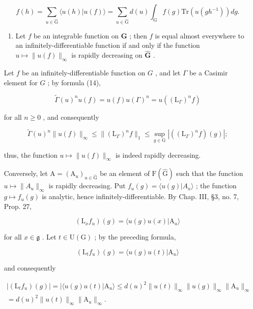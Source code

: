 \[
f (h) = \sum_ {u \in \hat {\mathrm{G}}} \langle u (h) | u (f) \rangle = \sum_ {u \in \hat {\mathrm{G}}} d (u) \int_ {\mathrm{G}} f (g) \mathrm{Tr} (u (g h ^ {- 1}))   d g.
\]

\begin{enumerate}
\def\labelenumi{\alph{enumi})}
\setcounter{enumi}{1}
\tightlist
\item
  Let \(f\) be an integrable function on \(\mathbf{G}\) ; then \(f\) is equal almost everywhere to an infinitely-differentiable function if and only if the function \(u \mapsto \| u(f) \|_{\infty}\) is rapidly decreasing on \(\hat{\mathbf{G}}\) .
\end{enumerate}

Let \(f\) be an infinitely-differentiable function on \(G\) , and let \(\Gamma\) be a Casimir element for \(G\) ; by formula (14),

\[
\tilde {\Gamma} (u) ^ {n} u (f) = u (f) u (\Gamma) ^ {n} = u ((\mathrm{L} _ {\Gamma}) ^ {n} f)
\]

for all \(n \geq 0\) , and consequently

\[
\tilde {\Gamma} (u) ^ {n} \| u (f) \| _ {\infty} \leq \| (\mathrm{L} _ {\Gamma}) ^ {n} f \| _ {1} \leq \sup _ {g \in \mathrm{G}} | ((\mathrm{L} _ {\Gamma}) ^ {n} f) (g) |;\tag{15}
\]

thus, the function \(u \mapsto \|u(f)\|_{\infty}\) is indeed rapidly decreasing.

Conversely, let \(\mathrm{A} = (\mathrm{A}_{u})_{u \in \hat{\mathrm{G}}}\) be an element of \(\mathrm{F}(\hat{\mathrm{G}})\) such that the function \(u \mapsto \|A_{u}\|_{\infty}\) is rapidly decreasing. Put \(f_{u}(g) = \langle u(g)|A_{u} \rangle\) ; the function \(g \mapsto f_{u}(g)\) is analytic, hence infinitely-differentiable. By Chap. III, §3, no. 7, Prop. 27,

\[
(\mathrm{L} _ {x} f _ {u}) (g) = \langle u (g) u (x) | \mathrm{A} _ {u} \rangle
\]

for all \(x \in \mathfrak{g}\) . Let \(t \in \mathrm{U}(\mathrm{G})\) ; by the preceding formula,

\[
(\mathrm{L} _ {t} f _ {u}) (g) = \langle u (g) u (t) | \mathrm{A} _ {u} \rangle
\]

and consequently

\[
\begin{array}{r} | (\mathrm{L} _ {t} f _ {u}) (g) | = | \langle u (g) u (t) | \mathrm{A} _ {u} \rangle \leq d (u) ^ {2} \| u (t) \| _ {\infty} \| u (g) \| _ {\infty} \| \mathrm{A} _ {u} \| _ {\infty} \\ = d (u) ^ {2} \| u (t) \| _ {\infty} \| \mathrm{A} _ {u} \| _ {\infty}. \end{array}
\]

